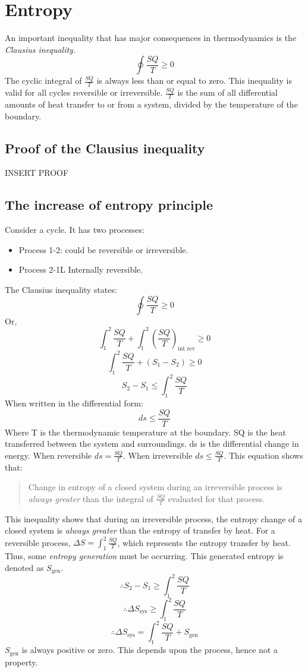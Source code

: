 \documentclass[class=report, crop=false, 12pt,a4paper]{standalone}
\begin{document}
\section{Entropy}
An important inequality that has major consequences in thermodynamics is the \emph{Clausius inequality}.
\[ \oint \frac{SQ}{T} \geq 0 \]
The cyclic integral of \( \frac{SQ}{T} \) is always less than or equal to zero. This inequality is valid for all cycles reversible or irreversible. \( \frac{SQ}{T} \) is the sum of all differential amounts of heat transfer to or from a system, divided by the temperature of the boundary.
\subsection{Proof of the Clausius inequality}
INSERT PROOF
\subsection{The increase of entropy principle}
Consider a cycle. It has two processes:
\begin{itemize}[noitemsep]
  \item Process 1-2: could be reversible or irreversible.
  \item Process 2-1L Internally reversible.
\end{itemize}
The Clausius inequality states:
\[ \oint \frac{SQ}{T} \geq 0 \]
Or,
\[ \int_1^2 \frac{SQ}{T} + \int_1^2\left( \frac{SQ}{T} \right)_{\textrm{int rev}} \geq 0 \]
\[ \int_1^2 \frac{SQ}{T} + (S_1 - S_2) \geq 0 \]
\[ S_2 - S_1 \leq \int_1^2 \frac{SQ}{T} \]
When written in the differential form:
\[ ds \leq \frac{SQ}{T} \]
Where T is the thermodynamic temperature at the boundary. SQ is the heat transferred between the system and surroundings. ds is the differential change in energy. When reversible \( ds = \frac{SQ}{T} \). When irreversible \( ds \leq \frac{SQ}{T} \). This equation shows that:
\begin{quote}
  \begin{center}
    Change in entropy of a closed system during an irreversible process is \emph{always greater} than the integral of \(\frac{SQ}{T}\) evaluated for that process.
  \end{center}
\end{quote}
This inequality shows that during an irreversible process, the entropy  change of a closed system is \emph{always greater} than the entropy of transfer by heat. For a reversible process, \( \Delta S = \int_1^2 \frac{SQ}{T} \), which represents the entropy transfer by heat. Thus, some \emph{entropy generation} must be occurring. This generated entropy is denoted as \(S_{\textrm{gen}}\).
\[ \therefore S_2 - S_1 \geq \int_1^2 \frac{SQ}{T} \]
\[ \therefore \Delta S_{\textrm{sys}} \geq \int_1^2 \frac{SQ}{T} \] 
\[ \therefore \Delta S_{\textrm{sys}} = \int_1^2 \frac{SQ}{T} + S_{\textrm{gen}} \]
\( S_{\textrm{gen}} \) is always positive or zero. This depends upon the process, hence not a property.
\end{document}
